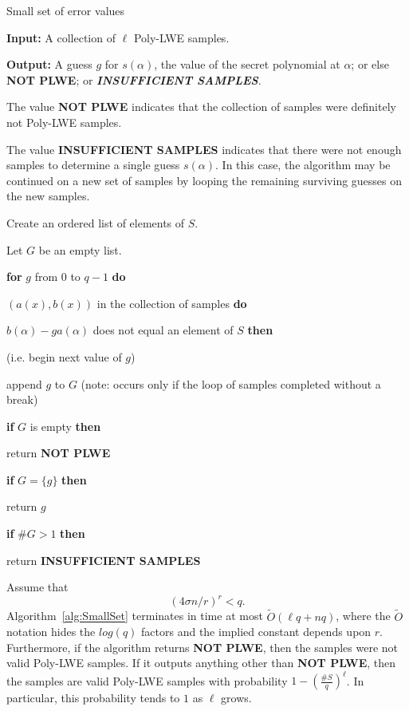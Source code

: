 \documentclass{llncs}
\newcommand{\<}{\langle}
\renewcommand{\>}{\rangle}
\begin{document}
\begin{algorithm}[H]
			\caption{Small set of error values}
			\label{alg:SmallSet}
                        \raggedright
{\bf Input:} A collection of $\ell$ Poly-LWE samples.

{\bf Output:} A guess $g$ for $s(\alpha)$, the value of the secret polynomial at $\alpha$; or else {\bf NOT PLWE}; or \emph{\bf INSUFFICIENT SAMPLES}.

The value {\bf NOT PLWE} indicates that the collection of samples were definitely not Poly-LWE samples.

The value {\bf INSUFFICIENT SAMPLES} indicates that there were not enough samples to determine a single guess $s(\alpha)$.  In this case, the algorithm may be continued on a new set of samples by looping the remaining surviving guesses on the new samples.

\vspace{1em}

Create an ordered list of elements of $S$.

Let $G$ be an empty list.

{\bf for} $g$ from $0$ to $q-1$ {\bf do}

\quad{} $(a(x), b(x))$ in the collection of samples {\bf do}

\quad \quad\quad{} $b(\alpha)- g a(\alpha)$ does not equal an element of $S$ {\bf then}

\quad\quad\quad\quad\quad{} (i.e. begin next value of $g$)

\quad\quad append $g$ to $G$ (note: occurs only if the loop of samples completed without a break)

{\bf if} $G$ is empty {\bf then}

\quad\quad return {\bf NOT PLWE}

{\bf if} $G = \{ g \} $ {\bf then}

\quad\quad return $g$

{\bf if} $\#G > 1$ {\bf then}

\quad return {\bf INSUFFICIENT SAMPLES}

\end{algorithm}

\begin{proposition}
        \label{prop:SmallSet}
Assume that
\begin{equation}
        \label{eqn:SmallSet}
        (4\sigma n /r)^r < q.
\end{equation}
Algorithm~\ref{alg:SmallSet} terminates in time at most $\widetilde{O}(\ell q + n q)$, where the $\widetilde{O}$ notation hides the $log(q)$ factors and the implied constant depends upon $r$.
        Furthermore, if the algorithm returns {\bf NOT PLWE}, then the samples were not valid Poly-LWE samples.
        If it outputs anything other than {\bf NOT PLWE}, then the samples are valid Poly-LWE samples with probability $1-(\frac{\#S}{q})^\ell$.
In particular, this probability tends to $1$ as $\ell$ grows.

\end{proposition}
\end{document}
